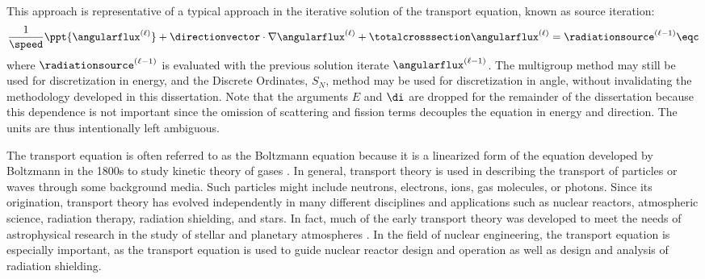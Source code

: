 This approach is representative of a typical approach in the iterative solution
of the transport equation, known as source iteration:
\begin{equation}
  \frac{1}{\speed}\ppt{\angularflux^{(\ell)}}
    + \directionvector\cdot\nabla\angularflux^{(\ell)}
    + \totalcrosssection\angularflux^{(\ell)} = \radiationsource^{(\ell-1)} \eqc
\end{equation}
where $\radiationsource^{(\ell-1)}$ is evaluated with the previous
solution iterate $\angularflux^{(\ell-1)}$. The multigroup
method may still be used for discretization in energy, and the
Discrete Ordinates, $S_N$, method may be used for discretization
in angle, without invalidating the methodology developed in this dissertation.
Note that the arguments $E$ and $\di$ are dropped for the remainder of the dissertation
because this dependence is not important since the omission of scattering
and fission terms decouples the equation in energy and direction.
The units are thus intentionally left ambiguous.

The transport equation is often referred to as the Boltzmann equation
because it is a linearized form of the equation developed by Boltzmann
in the 1800s to study kinetic theory of gases \cite{duderstadt}\cite{glasstone}.
In general, transport theory is used in describing the transport of particles
or waves through some background media. Such particles might include neutrons,
electrons, ions, gas molecules, or photons.
Since its origination, transport theory has evolved independently in many
different disciplines and applications such as nuclear reactors,
atmospheric science, radiation therapy, radiation shielding, and stars.
In fact, much of the early transport theory was developed to meet the needs
of astrophysical research in the study of stellar and planetary
atmospheres \cite{duderstadt}.
In the field of nuclear engineering, the transport equation is
especially important, as the transport equation is used to guide nuclear
reactor design and operation as well as design and analysis of
radiation shielding.


